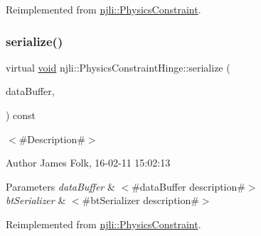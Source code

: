 Reimplemented from \mbox{\hyperlink{classnjli_1_1_physics_constraint_ae3dc487da3069d859bb4ddb05aa2e779}{njli\+::\+Physics\+Constraint}}.

\mbox{\label{classnjli_1_1_physics_constraint_hinge_ab3af6e3d64bf17cdf5cef687df03cdda}} 
\subsubsection{\texorpdfstring{serialize()}{serialize()}}
{\footnotesize\ttfamily virtual \mbox{\hyperlink{_thread_8h_af1e856da2e658414cb2456cb6f7ebc66}{void}} njli\+::\+Physics\+Constraint\+Hinge\+::serialize (\begin{DoxyParamCaption}\item[{\mbox{\hyperlink{_thread_8h_af1e856da2e658414cb2456cb6f7ebc66}{void}} $\ast$}]{data\+Buffer,  }\item[{bt\+Serializer $\ast$}]{ }\end{DoxyParamCaption}) const\hspace{0.3cm}{\ttfamily [virtual]}}



$<$\#\+Description\#$>$ 

\begin{DoxyAuthor}{Author}
James Folk, 16-\/02-\/11 15\+:02\+:13
\end{DoxyAuthor}

\begin{DoxyParams}{Parameters}
{\em data\+Buffer} & $<$\#data\+Buffer description\#$>$ \\
\hline
{\em bt\+Serializer} & $<$\#bt\+Serializer description\#$>$ \\
\hline
\end{DoxyParams}


Reimplemented from \mbox{\hyperlink{classnjli_1_1_physics_constraint_ae294d089963246a8e65b41913730efb1}{njli\+::\+Physics\+Constraint}}.

\mbox{\label{classnjli_1_1_physics_constraint_hinge_a29156cea121d2887e74204e3bbb79adf}} 
